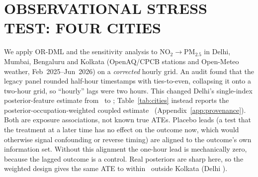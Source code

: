 \documentclass[twoside]{article}
\theoremstyle{definition}
\newcommand{\lmin}{\lambda_{\min}}
\begin{document}
\section{OBSERVATIONAL STRESS TEST: FOUR CITIES}
\label{sec:empirical}

We apply OR-DML and the sensitivity analysis to NO$_2\to$PM$_{2.5}$ in Delhi, Mumbai, Bengaluru and Kolkata (OpenAQ/CPCB stations and Open-Meteo weather, Feb~2025--Jun~2026) on a \emph{corrected} hourly grid. An audit found that the legacy panel rounded half-hour timestamps with ties-to-even, collapsing it onto a two-hour grid, so ``hourly'' lags were two hours. This changed Delhi's single-index posterior-feature estimate from \LegacyDelhi\ to \PooledDelhi; Table~\ref{tab:cities} instead reports the posterior-occupation-weighted coupled estimate \CityDelhiATE\ (Appendix~\ref{app:provenance}). Both are exposure associations, not known true ATEs. Placebo leads (a test that the treatment at a later time has no effect on the outcome now, which would otherwise signal confounding or reverse timing) are aligned to the outcome's own information set. Without this alignment the one-hour lead is mechanically zero, because the lagged outcome is a control. Real posteriors are sharp here, so the weighted design gives the same ATE to within \CityMaxATEDiff\ outside Kolkata (Delhi \CityDelhiATEW).

\begin{table}[!b]
\centering\footnotesize\setlength{\tabcolsep}{3.5pt}
\caption{Four-city stress test on the corrected hourly grid (OR-DML, HAC lag 24\,h). $\lmin$ is raw, $\lambda^{\rm std}_{\min}$ is scale-free. Lead placebo: smallest $p$-value over leads $h\in\{-6,-3,-1\}$\,h. $b^\star$: robustness value in SD of $\tilde Y$ (posterior-feature analysis; for screened rows, its own screened sample). Screened: runs of $\ge6$ identical NO$_2$ readings removed (no change for Delhi).}
\label{tab:cities}
\vspace{1mm}
\resizebox{\textwidth}{!}{}
\vspace{-3mm}
\end{table}
\end{document}
